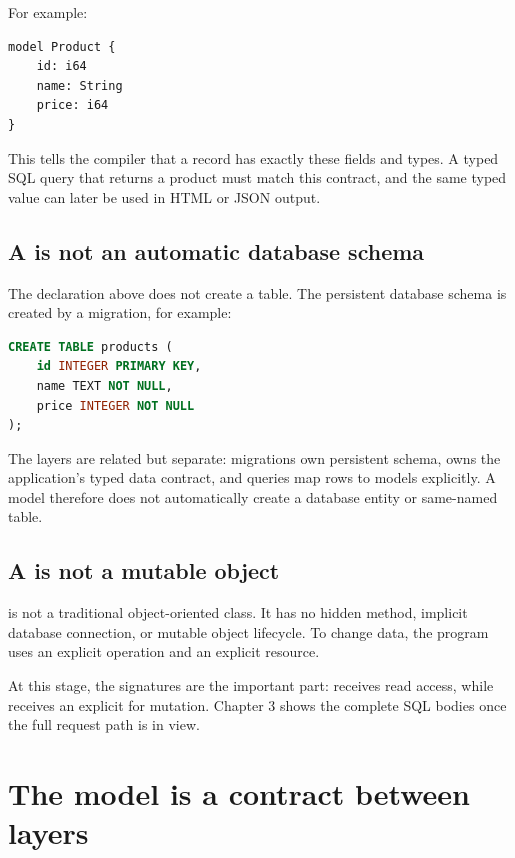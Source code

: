 For example:

\begin{lstlisting}[language=Velran]
model Product {
    id: i64
    name: String
    price: i64
}
\end{lstlisting}

This tells the compiler that a  record has exactly these fields and types. A typed SQL query that returns a product must match this contract, and the same typed value can later be used in HTML or JSON output.

\subsection*{A  is not an automatic database schema}

The declaration above does not create a  table. The persistent database schema is created by a migration, for example:

\begin{lstlisting}[language=SQL]
CREATE TABLE products (
    id INTEGER PRIMARY KEY,
    name TEXT NOT NULL,
    price INTEGER NOT NULL
);
\end{lstlisting}

The layers are related but separate: migrations own persistent schema,  owns the application's typed data contract, and queries map rows to models explicitly. A model therefore does not automatically create a database entity or same-named table.

\subsection*{A  is not a mutable object}

 is not a traditional object-oriented class. It has no hidden  method, implicit database connection, or mutable object lifecycle. To change data, the program uses an explicit operation and an explicit resource.

At this stage, the signatures are the important part:  receives  read access, while  receives an explicit  for mutation. Chapter 3 shows the complete SQL bodies once the full request path is in view.

\section{The model is a contract between layers}

